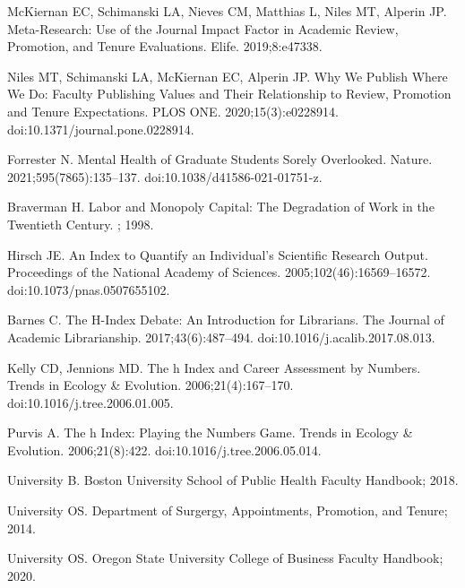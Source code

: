 \documentclass[
  10pt,
  letterpaper,
]{article}
\begin{document}
\begin{thebibliography}{10}
McKiernan EC, Schimanski LA, Nieves CM, Matthias L, Niles MT, Alperin JP.
\newblock Meta-Research: {{Use}} of the Journal Impact Factor in Academic Review, Promotion, and Tenure Evaluations.
\newblock Elife. 2019;8:e47338.

Niles MT, Schimanski LA, McKiernan EC, Alperin JP.
\newblock Why We Publish Where We Do: {{Faculty}} Publishing Values and Their Relationship to Review, Promotion and Tenure Expectations.
\newblock PLOS ONE. 2020;15(3):e0228914.
\newblock doi:{10.1371/journal.pone.0228914}.

Forrester N.
\newblock Mental Health of Graduate Students Sorely Overlooked.
\newblock Nature. 2021;595(7865):135--137.
\newblock doi:{10.1038/d41586-021-01751-z}.

Braverman H.
\newblock Labor and Monopoly Capital: {{The}} Degradation of Work in the Twentieth Century.
; 1998.

Hirsch JE.
\newblock An Index to Quantify an Individual's Scientific Research Output.
\newblock Proceedings of the National Academy of Sciences. 2005;102(46):16569--16572.
\newblock doi:{10.1073/pnas.0507655102}.

Barnes C.
\newblock The H-Index {{Debate}}: {{An Introduction}} for {{Librarians}}.
\newblock The Journal of Academic Librarianship. 2017;43(6):487--494.
\newblock doi:{10.1016/j.acalib.2017.08.013}.

Kelly CD, Jennions MD.
\newblock The h Index and Career Assessment by Numbers.
\newblock Trends in Ecology \& Evolution. 2006;21(4):167--170.
\newblock doi:{10.1016/j.tree.2006.01.005}.

Purvis A.
\newblock The h Index: Playing the Numbers Game.
\newblock Trends in Ecology \& Evolution. 2006;21(8):422.
\newblock doi:{10.1016/j.tree.2006.05.014}.

University B.
\newblock Boston {{University School}} of {{Public Health Faculty Handbook}}; 2018.

University OS.
\newblock Department of {{Surgergy}}, {{Appointments}}, {{Promotion}}, and {{Tenure}}; 2014.

University OS.
\newblock Oregon {{State University College}} of {{Business Faculty Handbook}}; 2020.


\end{thebibliography}
\end{document}
